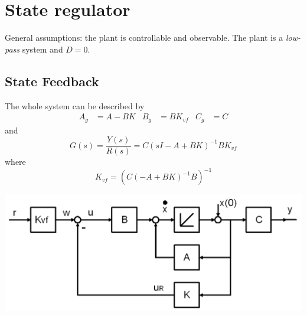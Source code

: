 \section{State regulator}
General assumptions: the plant is controllable and observable.
The plant is a \emph{low-pass} system and $D=0$.

\subsection{State Feedback}

\begin{minipage}{10cm}
    The whole system can be described by
    \begin{align*}
        A_g &= A-BK & B_g &= B K_{vf} & C_g &= C
    \end{align*}
    and
    \[
        G(s) = \frac{Y(s)}{R(s)} = C(sI-A+BK)^{-1}BK_{vf}
    \]
    where
    \[
        K_{vf} = (C(-A+BK)^{-1}B)^{-1}
    \]
\end{minipage}
\hspace{0.5cm}
\begin{minipage}{8cm}
    \centering
    \includegraphics[width=\linewidth]{./bilder/statereg.png}
\end{minipage}

